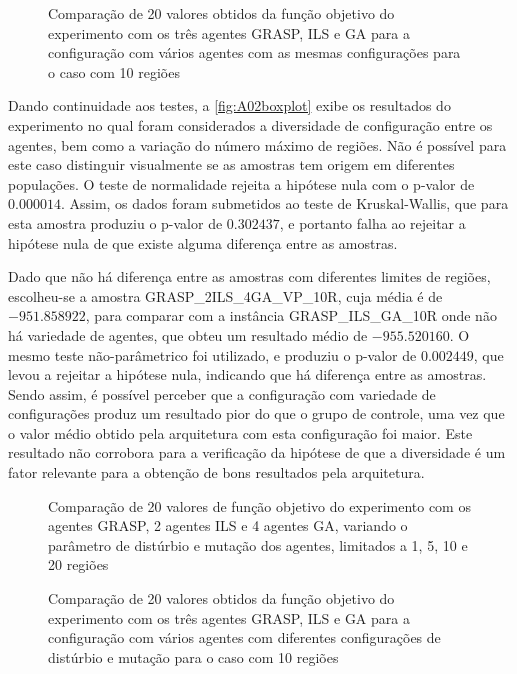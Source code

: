 \begin{figure}
    \centering
    \caption{Comparação de 20 valores obtidos da função objetivo do experimento com os três agentes GRASP, ILS e GA para a configuração com vários agentes com as mesmas configurações para o caso com 10 regiões}
    
    \label{fig:A0A01boxplot}
\end{figure}

Dando continuidade aos testes, a \autoref{fig:A02boxplot} exibe os resultados do experimento no qual foram considerados a diversidade de configuração entre os agentes, bem como a variação do número máximo de regiões. Não é possível para este caso distinguir visualmente se as amostras tem origem em diferentes populações. O teste de normalidade rejeita a hipótese nula com o p-valor de $0.000014$. Assim, os dados foram submetidos ao teste de Kruskal-Wallis, que  para esta amostra produziu o p-valor de $0.302437$, e portanto falha ao rejeitar a hipótese nula de que existe alguma diferença entre as amostras. 

Dado que não há diferença entre as amostras com diferentes limites de regiões, escolheu-se a amostra GRASP\_2ILS\_4GA\_VP\_10R, cuja média é de $-951.858922$, para comparar com a instância GRASP\_ILS\_GA\_10R onde não há variedade de agentes, que obteu um resultado médio de $-955.520160$. O mesmo teste não-parâmetrico foi utilizado, e produziu o p-valor de $0.002449$, que levou a rejeitar a hipótese nula, indicando que há diferença entre as amostras. Sendo assim, é possível perceber que a configuração com variedade de configurações produz um resultado pior do que o grupo de controle, uma vez que o valor médio obtido pela arquitetura com esta configuração foi maior. Este resultado não corrobora para a verificação da hipótese de que a diversidade é um fator relevante para a obtenção de bons resultados pela arquitetura. 

\begin{figure}[ht!]
    \centering
    \caption{Comparação de 20 valores de função objetivo do experimento com os agentes GRASP, 2 agentes ILS e 4 agentes GA, variando o parâmetro de distúrbio e mutação dos agentes, limitados a 1, 5, 10 e 20 regiões}
    
    \label{fig:A02boxplot}
\end{figure}

\begin{figure}[ht!]
    \centering
    \caption{Comparação de 20 valores obtidos da função objetivo do experimento com os três agentes GRASP, ILS e GA para a configuração com vários agentes com diferentes configurações de distúrbio e mutação para o caso com 10 regiões}%
    
    \label{fig:A0A02boxplot}
\end{figure}

